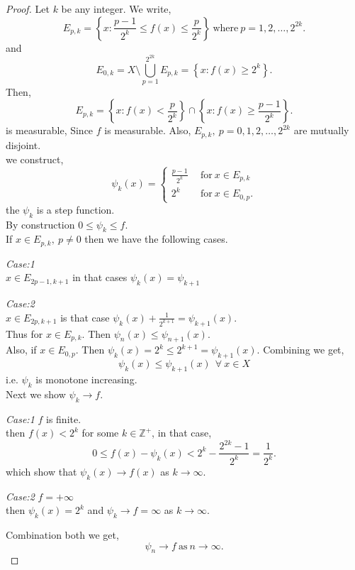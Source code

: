 \begin{proof}
    Let $k$ be any integer. We write,
     \[
         E_{p,k}=\left\{ x:\frac{p-1}{2^{k}}\le f(x)\le \frac{p}{2^{k}} \right\} \ \text{where}\ p=1,2,\ldots,2^{2k}.
    \]
    and 
    \[
        E_{0,k}=X\setminus \bigcup_{p=1}^{2^{2k}}E_{p,k}=\left\{ x:f(x)\ge 2^{k} \right\}.
    \]
    Then,
    \[
        E_{p,k}=\left\{ x:f(x)<\frac{p}{2^{k}} \right\}\cap\left\{ x:f(x)\ge \frac{p-1}{2^{k}} \right\}.
    \]
    is measurable, Since $f$ is measurable.
    Also, $E_{p,k},\ p=0,1,2,\ldots,2^{2k}$ are mutually disjoint.\\
    we construct,
    \[
        \psi_k(x)=
        \begin{cases}
            \frac{p-1}{2^{k}}\ \ &\text{for} \ x\in E_{p,k}\\
            2^{k} &\text{for} \ x\in E_{0,p}.
        \end{cases}
    \]
    the $\psi_k$ is a step function.\\
    By construction $0\le \psi_k\le f$.\\
    If $x\in E_{p,k},\ p\neq 0$ then we have the following cases.
    
    \textit{Case:1}\\
    $x\in E_{2p-1,k+1}$ in that cases  $\psi_k(x)=\psi_{k+1}$
    
    \textit{Case:2}\\
    $x\in E_{2p,k+1}$ is that case $\psi_k(x)+\frac{1}{2^{k+1}}=\psi_{k+1}(x)$.\\
    Thus for $x\in E_{p,k}$.  Then $\psi_n(x)\le \psi_{n+1}(x)$.\\
    Also, if $x\in E_{0,p}$. Then $\psi_k(x)=2^{k}\le 2^{k+1}=\psi_{k+1}(x)$.
    Combining we get,
    \[
        \psi_k(x)\le \psi_{k+1}(x) \ \ \forall\ x\in X
    \]
    i.e. $\psi_k$ is monotone increasing.\\
    Next we show  $\psi_k\to f$.
    
    \textit{Case:1} $f$ is finite.\\
    then $f(x)<2^{k}$ for some $k\in\mathds{Z}^{+}$, in that case,
    \[
        0\le f(x)-\psi_k(x)<2^{k}-\frac{2^{2k}-1}{2^{k}}=\frac{1}{2^{k}}.
    \]
    which show that $\psi_k(x)\to f(x)$ as  $k\to\infty$.

    \textit{Case:2} $f=+\infty$\\
    then $\psi_k(x)=2^{k}$ and $\psi_k\to f=\infty$ as $k\to\infty$.

    Combination both we get, 
    \[
        \psi_n\to f \ \text{as}\ n\to\infty.
    \]
\end{proof}

